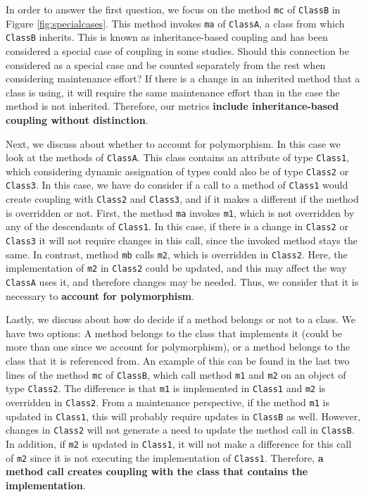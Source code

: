 \documentclass[a4paper]{article}
\begin{document}
In order to answer the first question, we focus on the method \texttt{mc} of \texttt{ClassB} in Figure \ref{fig:specialcases}. This method invokes \texttt{ma} of \texttt{ClassA}, a class from which \texttt{ClassB} inherits. This is known as inheritance-based coupling and has been considered a special case of coupling in some studies. Should this connection be considered as a special case and be counted separately from the rest when considering maintenance effort? If there is a change in an inherited method that a class is using, it will require the same maintenance effort than in the case the method is not inherited. Therefore, our metrics \textbf{include inheritance-based coupling without distinction}.

Next, we discuss about whether to account for polymorphism. In this case we look at the methods of \texttt{ClassA}. This class contains an attribute of type \texttt{Class1}, which considering dynamic assignation of types could also be of type \texttt{Class2} or \texttt{Class3}. In this case, we have do consider if a call to a method of \texttt{Class1} would create coupling with \texttt{Class2} and \texttt{Class3}, and if it makes a different if the method is overridden or not. First, the method \texttt{ma} invokes \texttt{m1}, which is not overridden by any of the descendants of \texttt{Class1}. In this case, if there is a change in \texttt{Class2} or \texttt{Class3} it will not require changes in this call, since the invoked method stays the same. In contrast, method \texttt{mb} calls \texttt{m2}, which is overridden in \texttt{Class2}. Here, the implementation of \texttt{m2} in \texttt{Class2} could be updated, and this may affect the way \texttt{ClassA} uses it, and therefore changes may be needed. Thus, we consider that it is necessary to \textbf{account for polymorphism}.

Lastly, we discuss about how do decide if a method belongs or not to a class. We have two options: A method belongs to the class that implements it (could be more than one since we account for polymorphism), or a method belongs to the class that it is referenced from. An example of this can be found in the last two lines of the method \texttt{mc} of \texttt{ClassB}, which call method \texttt{m1} and \texttt{m2} on an object of type \texttt{Class2}. The difference is that \texttt{m1} is implemented in \texttt{Class1} and \texttt{m2} is overridden in \texttt{Class2}. From a maintenance perspective, if the method \texttt{m1} is updated in \texttt{Class1}, this will probably require updates in \texttt{ClassB} as well. However, changes in \texttt{Class2} will not generate a need to update the method call in \texttt{ClassB}. In addition, if  \texttt{m2} is updated in \texttt{Class1}, it will not make a difference for this call of \texttt{m2} since it is not executing the implementation of \texttt{Class1}. Therefore, \textbf{a method call creates coupling with the class that contains the implementation}.
\end{document}
